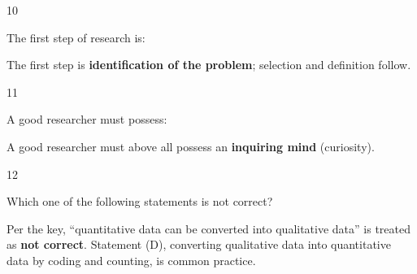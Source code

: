 \begin{question}{10}
{The first step of research is:\par}
\begin{explain}
The first step is \textbf{identification of the problem}; selection and definition follow.
\end{explain}
\end{question}

\begin{question}{11}
{A good researcher must possess:\par}
\begin{explain}
A good researcher must above all possess an \textbf{inquiring mind} (curiosity).
\end{explain}
\end{question}

\begin{question}{12}
{Which one of the following statements is not correct?\par}
\begin{explain}
Per the key, ``quantitative data can be converted into qualitative data'' is treated as \textbf{not correct}. Statement (D), converting qualitative data into quantitative data by coding and counting, is common practice.
\end{explain}
\end{question}

